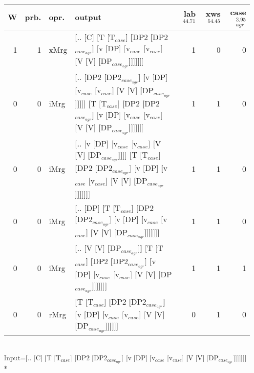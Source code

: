 \begin{tabularx}{\linewidth}{rrlXrrr}
\hline
   W &   prb. & opr.   & output                                                                                                                                                        &   lab$^{44.71}$ &   xws$^{54.45}$ &   case$_{agr}^{3.95}$ \\
\hline
   1 &   1 & xMrg & [.. [C] [T [T$_{case}$] [DP2 [DP2$_{case_{agr}}$] [v [DP] [v$_{case}$ [v$_{case}$] [V [V] [DP$_{case_{agr}}$]]]]]]]                                                                   &             1 &             0 &                  0 \\
   0 &   0 & iMrg & [.. [DP2 [DP2$_{case_{agr}}$] [v [DP] [v$_{case}$ [v$_{case}$] [V [V] [DP$_{case_{agr}}$]]]]] [T [T$_{case}$] [DP2 [DP2$_{case_{agr}}$] [v [DP] [v$_{case}$ [v$_{case}$] [V [V] [DP$_{case_{agr}}$]]]]]]] &             1 &             1 &                  0 \\
   0 &   0 & iMrg & [.. [v [DP] [v$_{case}$ [v$_{case}$] [V [V] [DP$_{case_{agr}}$]]]] [T [T$_{case}$] [DP2 [DP2$_{case_{agr}}$] [v [DP] [v$_{case}$ [v$_{case}$] [V [V] [DP$_{case_{agr}}$]]]]]]]                      &             1 &             1 &                  0 \\
   0 &   0 & iMrg & [.. [DP] [T [T$_{case}$] [DP2 [DP2$_{case_{agr}}$] [v [DP] [v$_{case}$ [v$_{case}$] [V [V] [DP$_{case_{agr}}$]]]]]]]                                                                  &             1 &             1 &                  0 \\
   0 &   0 & iMrg & [.. [V [V] [DP$_{case_{agr}}$]] [T [T$_{case}$] [DP2 [DP2$_{case_{agr}}$] [v [DP] [v$_{case}$ [v$_{case}$] [V [V] [DP$_{case_{agr}}$]]]]]]]                                                 &             1 &             1 &                  1 \\
   0 &   0 & rMrg & [T [T$_{case}$] [DP2 [DP2$_{case_{agr}}$] [v [DP] [v$_{case}$ [v$_{case}$] [V [V] [DP$_{case_{agr}}$]]]]]]                                                                            &             0 &             1 &                  0 \\
\hline
\end{tabularx}\endgroup\\
\begingroup\scriptsize Input=[.. [C] [T [T$_{case}$] [DP2 [DP2$_{case_{agr}}$] [v [DP] [v$_{case}$ [v$_{case}$] [V [V] [DP$_{case_{agr}}$]]]]]]]\\*
